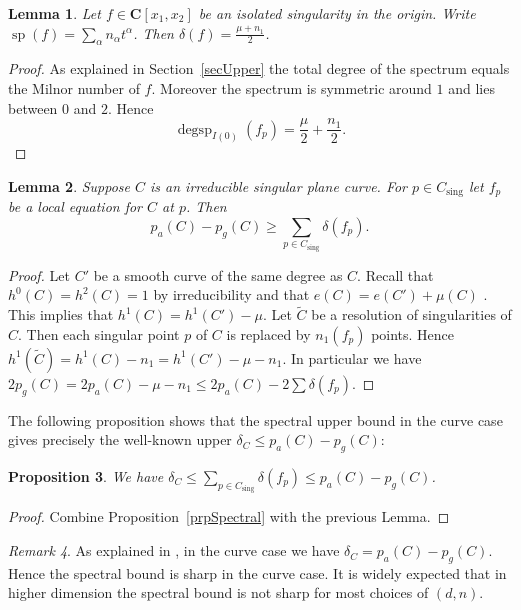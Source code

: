 \documentclass{amsart}
\newcommand{\C}{\mathbf{C}}
\newtheorem{lemma}{Lemma}[section]
\newtheorem{proposition}[lemma]{Proposition}
\theoremstyle{definition}
\theoremstyle{remark}
\newtheorem{remark}[lemma]{Remark}
\DeclareMathOperator{\degsp}{degsp}
\DeclareMathOperator{\sing}{sing}
\DeclareMathOperator{\spe}{sp}
\begin{document}
\begin{lemma} Let $f\in \C[x_1,x_2]$ be an isolated singularity in the origin. Write $\spe(f)=\sum_{\alpha} n_{\alpha} t^\alpha$. Then $\delta(f)= \frac{\mu+n_1}{2}$.
\end{lemma}

\begin{proof}
As explained in Section~\ref{secUpper}
the total degree of the spectrum equals the Milnor number of $f$. Moreover the spectrum is symmetric around $1$ and lies between $0$ and $2$. Hence
\[ \degsp_{I(0)}(f_p)=\frac{\mu}{2}+\frac{n_1}{2}.\] 
\end{proof}

\begin{lemma} Suppose $C$ is an irreducible singular plane curve. For $p\in C_{\sing}$ let $f_p$ be a local equation for $C$ at $p$. Then
\[ p_a(C)-p_g(C)\geq \sum_{p\in C_{\sing}} \delta(f_p).\]
\end{lemma}

\begin{proof} Let $C'$ be a smooth curve of the same degree as $C$. 
Recall that $h^0(C)=h^2(C)=1$ by irreducibility and that $e(C)=e(C')+\mu(C)$ \cite[Corollary 5.4.4]{Dim}. This implies that $h^1(C)=h^1(C')-\mu$. Let $\tilde{C}$ be a resolution of singularities of $C$. Then each singular point $p$ of $C$ is replaced by $n_1(f_p)$ points.
Hence  $h^1(\tilde{C})=h^1(C)-n_1=h^1(C')-\mu-n_1$. In particular we have $2p_g(C)=2p_a(C)-\mu-n_1\leq 2p_a(C)-2\sum \delta(f_p)$.
\end{proof}

The following proposition shows that the spectral upper bound in the curve case gives precisely the well-known upper $\delta_C\leq p_a(C)-p_g(C)$:

\begin{proposition} We have  $\delta_C\leq \sum_{p\in C_{\sing}} \delta(f_p)\leq p_a(C)-p_g(C)$.
\end{proposition}
\begin{proof}
Combine Proposition~\ref{prpSpectral} with the previous Lemma.
\end{proof} 
\begin{remark} As explained in \cite{CiGa26}, in the curve case we have $\delta_C=p_a(C)-p_g(C)$. Hence the spectral bound is sharp in the curve case. It is widely expected that in higher dimension the spectral bound is not sharp for most choices of $(d,n)$.
\end{remark}


\end{document}
